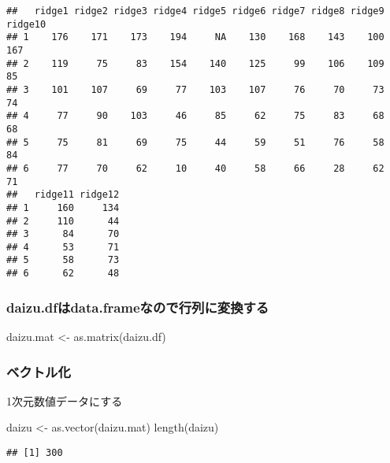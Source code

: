 \documentclass[
]{article}
\newenvironment{Shaded}{\begin{snugshade}}{\end{snugshade}}
\newcommand{\FunctionTok}[1]{\textcolor[rgb]{0.00,0.00,0.00}{#1}}
\newcommand{\NormalTok}[1]{#1}
\newcommand{\OtherTok}[1]{\textcolor[rgb]{0.56,0.35,0.01}{#1}}
\begin{document}
\begin{verbatim}
##   ridge1 ridge2 ridge3 ridge4 ridge5 ridge6 ridge7 ridge8 ridge9 ridge10
## 1    176    171    173    194     NA    130    168    143    100     167
## 2    119     75     83    154    140    125     99    106    109      85
## 3    101    107     69     77    103    107     76     70     73      74
## 4     77     90    103     46     85     62     75     83     68      68
## 5     75     81     69     75     44     59     51     76     58      84
## 6     77     70     62     10     40     58     66     28     62      71
##   ridge11 ridge12
## 1     160     134
## 2     110      44
## 3      84      70
## 4      53      71
## 5      58      73
## 6      62      48
\end{verbatim}

\hypertarget{daizu.dfux306fdata.frameux306aux306eux3067ux884cux5217ux306bux5909ux63dbux3059ux308b}{%
\subsubsection{daizu.dfはdata.frameなので行列に変換する}\label{daizu.dfux306fdata.frameux306aux306eux3067ux884cux5217ux306bux5909ux63dbux3059ux308b}}

\begin{Shaded}
\begin{Highlighting}[]
\NormalTok{    daizu.mat }\OtherTok{\textless{}{-}} \FunctionTok{as.matrix}\NormalTok{(daizu.df)}
\end{Highlighting}
\end{Shaded}

\hypertarget{ux30d9ux30afux30c8ux30ebux5316}{%
\subsubsection{ベクトル化}\label{ux30d9ux30afux30c8ux30ebux5316}}

1次元数値データにする

\begin{Shaded}
\begin{Highlighting}[]
\NormalTok{    daizu }\OtherTok{\textless{}{-}} \FunctionTok{as.vector}\NormalTok{(daizu.mat)}
    \FunctionTok{length}\NormalTok{(daizu)}
\end{Highlighting}
\end{Shaded}

\begin{verbatim}
## [1] 300
\end{verbatim}
\end{document}
